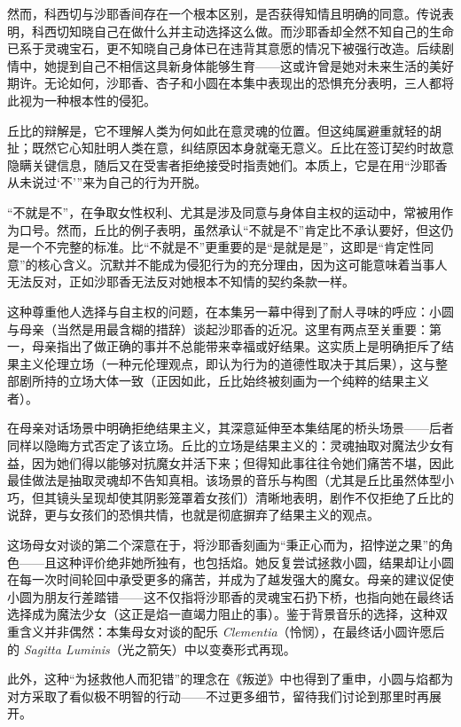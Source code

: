 然而，科西切与沙耶香间存在一个根本区别，是否获得知情且明确的同意。传说表明，科西切知晓自己在做什么并主动选择这么做。而沙耶香却全然不知自己的生命已系于灵魂宝石，更不知晓自己身体已在违背其意愿的情况下被强行改造。后续剧情中，她提到自己不相信这具新身体能够生育——这或许曾是她对未来生活的美好期许。无论如何，沙耶香、杏子和小圆在本集中表现出的恐惧充分表明，三人都将此视为一种根本性的侵犯。 

丘比的辩解是，它不理解人类为何如此在意灵魂的位置。但这纯属避重就轻的胡扯；既然它心知肚明人类在意，纠结原因本身就毫无意义。丘比在签订契约时故意隐瞒关键信息，随后又在受害者拒绝接受时指责她们。本质上，它是在用“沙耶香从未说过‘不’”来为自己的行为开脱。  

“不就是不”，在争取女性权利、尤其是涉及同意与身体自主权的运动中，常被用作为口号。然而，丘比的例子表明，虽然承认“不就是不”肯定比不承认要好，但这仍是一个不完整的标准。比“不就是不”更重要的是“是就是是”，这即是“肯定性同意”的核心含义\cite{ref37}。沉默并不能成为侵犯行为的充分理由，因为这可能意味着当事人无法反对，正如沙耶香无法反对她根本不知情的契约条款一样。 

这种尊重他人选择与自主权的问题，在本集另一幕中得到了耐人寻味的呼应：小圆与母亲（当然是用最含糊的措辞）谈起沙耶香的近况。这里有两点至关重要：第一，母亲指出了做正确的事并不总能带来幸福或好结果。这实质上是明确拒斥了结果主义伦理立场（一种元伦理观点，即认为行为的道德性取决于其后果\cite{ref38}），这与整部剧所持的立场大体一致（正因如此，丘比始终被刻画为一个纯粹的结果主义者）。 

在母亲对话场景中明确拒绝结果主义，其深意延伸至本集结尾的桥头场景——后者同样以隐晦方式否定了该立场。丘比的立场是结果主义的：灵魂抽取对魔法少女有益，因为她们得以能够对抗魔女并活下来；但得知此事往往令她们痛苦不堪，因此最佳做法是抽取灵魂却不告知真相。该场景的音乐与构图（尤其是丘比虽然体型小巧，但其镜头呈现却使其阴影笼罩着女孩们）清晰地表明，剧作不仅拒绝了丘比的说辞，更与女孩们的恐惧共情，也就是彻底摒弃了结果主义的观点。  

这场母女对谈的第二个深意在于，将沙耶香刻画为“秉正心而为，招悖逆之果”的角色——且这种评价绝非她所独有，也包括焰。她反复尝试拯救小圆，结果却让小圆在每一次时间轮回中承受更多的痛苦，并成为了越发强大的魔女。母亲的建议促使小圆为朋友行差踏错——这不仅指将沙耶香的灵魂宝石扔下桥，也指向她在最终话选择成为魔法少女（这正是焰一直竭力阻止的事）。鉴于背景音乐的选择，这种双重含义并非偶然：本集母女对谈的配乐 \emph{Clementia}（怜悯），在最终话小圆许愿后的 \emph{Sagitta Luminis}（光之箭矢）中以变奏形式再现。  

此外，这种“为拯救他人而犯错”的理念在《叛逆》中也得到了重申，小圆与焰都为对方采取了看似极不明智的行动——不过更多细节，留待我们讨论到那里时再展开。
